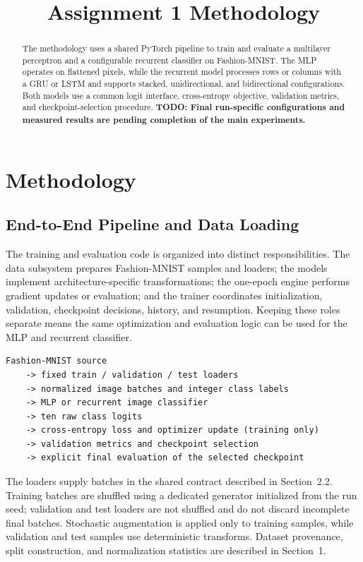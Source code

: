 \documentclass[11pt,a4paper]{article}
\title{Assignment 1 Methodology}
\author{}
\date{}
\begin{document}
\maketitle

\begin{abstract}
The methodology uses a shared PyTorch pipeline to train and evaluate a multilayer perceptron and a configurable recurrent classifier on Fashion-MNIST. The MLP operates on flattened pixels, while the recurrent model processes rows or columns with a GRU or LSTM and supports stacked, unidirectional, and bidirectional configurations. Both models use a common logit interface, cross-entropy objective, validation metrics, and checkpoint-selection procedure. \textbf{TODO: Final run-specific configurations and measured results are pending completion of the main experiments.}
\end{abstract}

\setcounter{section}{1}
\section{Methodology}

\subsection{End-to-End Pipeline and Data Loading}

The training and evaluation code is organized into distinct responsibilities. The data subsystem prepares Fashion-MNIST samples and loaders; the models implement architecture-specific transformations; the one-epoch engine performs gradient updates or evaluation; and the trainer coordinates initialization, validation, checkpoint decisions, history, and resumption. Keeping these roles separate means the same optimization and evaluation logic can be used for the MLP and recurrent classifier.

\begin{lstlisting}[caption={Conceptual end-to-end data and training flow.},label={lst:pipeline}]
Fashion-MNIST source
    -> fixed train / validation / test loaders
    -> normalized image batches and integer class labels
    -> MLP or recurrent image classifier
    -> ten raw class logits
    -> cross-entropy loss and optimizer update (training only)
    -> validation metrics and checkpoint selection
    -> explicit final evaluation of the selected checkpoint
\end{lstlisting}

The loaders supply batches in the shared contract described in Section~2.2. Training batches are shuffled using a dedicated generator initialized from the run seed; validation and test loaders are not shuffled and do not discard incomplete final batches. Stochastic augmentation is applied only to training samples, while validation and test samples use deterministic transforms. Dataset provenance, split construction, and normalization statistics are described in Section~1.
\end{document}
